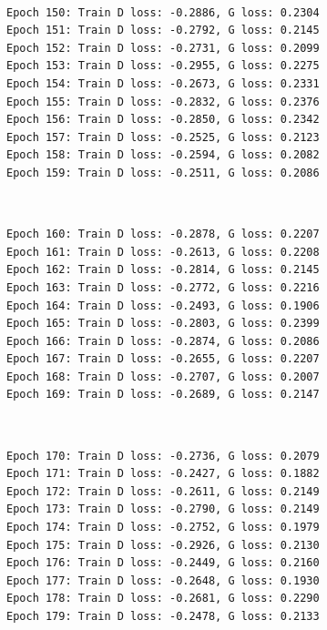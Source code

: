 \documentclass[11pt]{article}
\begin{document}
    \begin{center}
    \end{center}
    { \hspace*{\fill} \\}
    
    \begin{Verbatim}[commandchars=\\\{\}]
Epoch 150: Train D loss: -0.2886, G loss: 0.2304
Epoch 151: Train D loss: -0.2792, G loss: 0.2145
Epoch 152: Train D loss: -0.2731, G loss: 0.2099
Epoch 153: Train D loss: -0.2955, G loss: 0.2275
Epoch 154: Train D loss: -0.2673, G loss: 0.2331
Epoch 155: Train D loss: -0.2832, G loss: 0.2376
Epoch 156: Train D loss: -0.2850, G loss: 0.2342
Epoch 157: Train D loss: -0.2525, G loss: 0.2123
Epoch 158: Train D loss: -0.2594, G loss: 0.2082
Epoch 159: Train D loss: -0.2511, G loss: 0.2086

    \end{Verbatim}

    \begin{center}
    \end{center}
    { \hspace*{\fill} \\}
    
    \begin{Verbatim}[commandchars=\\\{\}]
Epoch 160: Train D loss: -0.2878, G loss: 0.2207
Epoch 161: Train D loss: -0.2613, G loss: 0.2208
Epoch 162: Train D loss: -0.2814, G loss: 0.2145
Epoch 163: Train D loss: -0.2772, G loss: 0.2216
Epoch 164: Train D loss: -0.2493, G loss: 0.1906
Epoch 165: Train D loss: -0.2803, G loss: 0.2399
Epoch 166: Train D loss: -0.2874, G loss: 0.2086
Epoch 167: Train D loss: -0.2655, G loss: 0.2207
Epoch 168: Train D loss: -0.2707, G loss: 0.2007
Epoch 169: Train D loss: -0.2689, G loss: 0.2147

    \end{Verbatim}

    \begin{center}
    \end{center}
    { \hspace*{\fill} \\}
    
    \begin{Verbatim}[commandchars=\\\{\}]
Epoch 170: Train D loss: -0.2736, G loss: 0.2079
Epoch 171: Train D loss: -0.2427, G loss: 0.1882
Epoch 172: Train D loss: -0.2611, G loss: 0.2149
Epoch 173: Train D loss: -0.2790, G loss: 0.2149
Epoch 174: Train D loss: -0.2752, G loss: 0.1979
Epoch 175: Train D loss: -0.2926, G loss: 0.2130
Epoch 176: Train D loss: -0.2449, G loss: 0.2160
Epoch 177: Train D loss: -0.2648, G loss: 0.1930
Epoch 178: Train D loss: -0.2681, G loss: 0.2290
Epoch 179: Train D loss: -0.2478, G loss: 0.2133

    \end{Verbatim}
\end{document}
